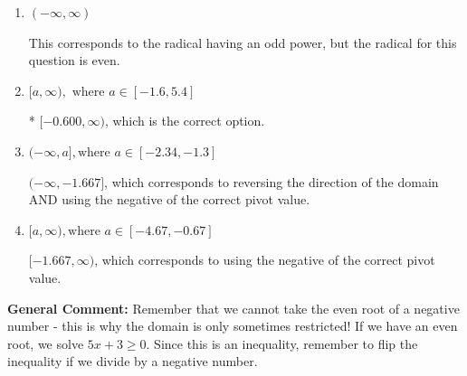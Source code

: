 \documentclass{extbook}[14pt]
\begin{document}
\begin{enumerate}
{\begin{enumerate}[label=\Alph*.]
 $(-\infty, -0.600]$, which corresponds to reversing the direction of the domain.
\item \( (-\infty, \infty) \)

This corresponds to the radical having an odd power, but the radical for this question is even.
\item \( [a, \infty), \text{ where } a \in [-1.6, 5.4] \)

* $[-0.600, \infty)$, which is the correct option.
\item \( (-\infty, a], \text{where } a \in [-2.34, -1.3] \)

$(-\infty, -1.667]$, which corresponds to reversing the direction of the domain AND using the negative of the correct pivot value.
\item \( [a, \infty), \text{where } a \in [-4.67, -0.67] \)

$[-1.667, \infty)$, which corresponds to using the negative of the correct pivot value.
\end{enumerate}

\textbf{General Comment:} Remember that we cannot take the even root of a negative number - this is why the domain is only sometimes restricted! If we have an even root, we solve $5 x + 3 \geq 0$. Since this is an inequality, remember to flip the inequality if we divide by a negative number.
}
\end{enumerate}
\end{document}
